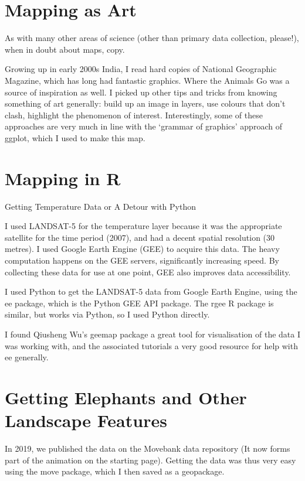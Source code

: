\begin{tcolorbox}[
  blanker,
  width=0.99\textwidth,
  before skip=6pt,
  colback=gray,
  breakable]
{    \section{Mapping as Art}
    
    As with many other areas of science (other than primary data collection, please!), when in doubt about maps, copy.

    Growing up in early 2000s India, I read hard copies of National Geographic Magazine, which has long had fantastic graphics. Where the Animals Go was a source of inspiration as well. I picked up other tips and tricks from knowing something of art generally: build up an image in layers, use colours that don’t clash, highlight the phenomenon of interest. Interestingly, some of these approaches are very much in line with the ‘grammar of graphics’ approach of ggplot, which I used to make this map.

    \section{Mapping in R}

    Getting Temperature Data or A Detour with Python

    I used LANDSAT-5 for the temperature layer because it was the appropriate satellite for the time period (2007), and had a decent spatial resolution (30 metres). I used Google Earth Engine (GEE) to acquire this data. The heavy computation happens on the GEE servers, significantly increasing speed. By collecting these data for use at one point, GEE also improves data accessibility.

    I used Python to get the LANDSAT-5 data from Google Earth Engine, using the ee package, which is the Python GEE API package. The rgee R package is similar, but works via Python, so I used Python directly.

    I found Qiusheng Wu’s geemap package a great tool for visualisation of the data I was working with, and the associated tutorials a very good resource for help with ee generally.

    \section{Getting Elephants and Other Landscape Features}

    In 2019, we published the data on the Movebank data repository (It now forms part of the animation on the starting page). Getting the data was thus very easy using the move package, which I then saved as a geopackage.

}
\end{tcolorbox}
